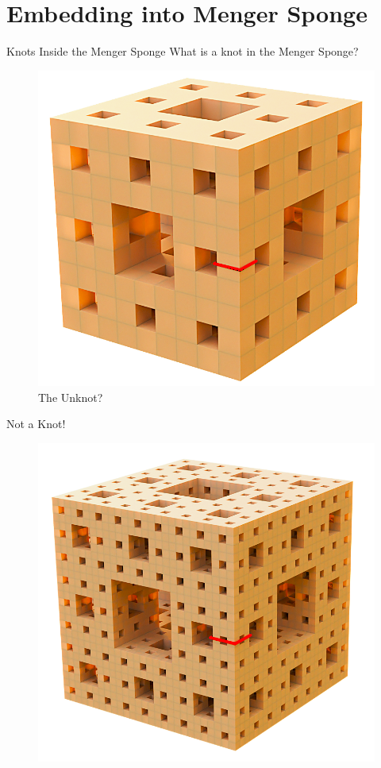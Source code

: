 \section[]{Embedding into Menger Sponge}
\begin{frame}{Knots Inside the Menger Sponge}
	What is a knot in the Menger Sponge?
	\begin{figure}
		\centering
		\includegraphics[width=0.35\linewidth]{UnknotTwo.png}
		\caption{The Unknot?}
		\label{fig:enter-label}
	\end{figure}
\end{frame}
\begin{frame}{Not a Knot!}
	\begin{figure}
		\centering
		\includegraphics[width=0.49\linewidth]{NotAKnot.png}
		\label{fig:enter-label}
	\end{figure}
\end{frame}

